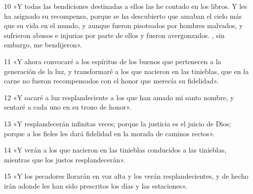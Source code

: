 \par 10 »Y todas las bendiciones destinadas a ellos las he contado en los libros. Y les ha asignado su recompensa, porque se ha descubierto que amaban el cielo más que su vida en el mundo, y aunque fueron pisoteados por hombres malvados, y sufrieron abusos e injurias por parte de ellos y fueron avergonzados. , sin embargo, me bendijeron».
\par 11 «Y ahora convocaré a los espíritus de los buenos que pertenecen a la generación de la luz, y transformaré a los que nacieron en las tinieblas, que en la carne no fueron recompensados ​​con el honor que merecía su fidelidad».
\par 12 «Y sacaré a luz resplandeciente a los que han amado mi santo nombre, y sentaré a cada uno en su trono de honor».
\par 13 »Y resplandecerán infinitas veces; porque la justicia es el juicio de Dios; porque a los fieles les dará fidelidad en la morada de caminos rectos».
\par 14 «Y verán a los que nacieron en las tinieblas conducidos a las tinieblas, mientras que los justos resplandecerán».
\par 15 «Y los pecadores llorarán en voz alta y los verán resplandecientes, y de hecho irán adonde les han sido prescritos los días y las estaciones».

